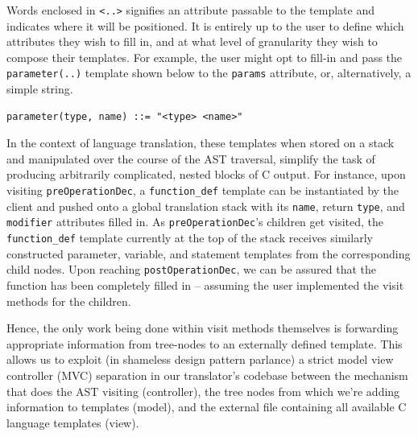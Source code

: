 \documentclass{sig-alternate}
\begin{document}
Words enclosed in \texttt{<..>} signifies an attribute passable to the template and indicates where it will be positioned. It is entirely up to the user to define which attributes they wish to fill in, and at what level of granularity they wish to compose their templates. For example, the user might opt to fill-in and pass the \texttt{parameter(..)} template shown below to the \texttt{params} attribute, or, alternatively, a simple string.

\begin{verbatim}
parameter(type, name) ::= "<type> <name>"
\end{verbatim}

In the context of language translation, these templates when stored on a stack and manipulated over the course of the AST traversal, simplify the task of producing arbitrarily complicated, nested blocks of C output. For instance, upon visiting \texttt{preOperationDec}, a \texttt{function\_def} template can be instantiated by the client and pushed onto a global translation stack with its \texttt{name}, return \texttt{type}, and \texttt{modifier} attributes filled in. As \texttt{preOperationDec}'s children get visited, the \texttt{function\_def} template currently at the top of the stack receives similarly constructed parameter, variable, and statement templates from the corresponding child nodes. Upon reaching \texttt{postOperationDec}, we can be assured that the function has been completely filled in -- assuming the user implemented the visit methods for the children.

Hence, the only work being done within visit methods themselves is forwarding appropriate information from tree-nodes to an externally defined template. This allows us to exploit (in shameless design pattern parlance) a strict model view controller (MVC) separation in our translator's codebase between the mechanism that does the AST visiting (controller), the tree nodes from which we're adding information to templates (model), and the external file containing all available C language templates (view).







\end{document}
